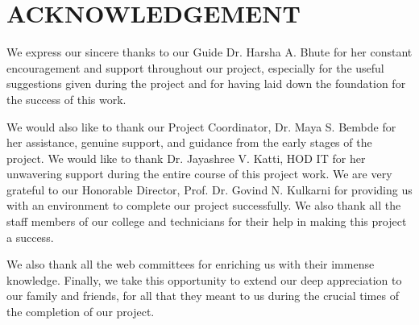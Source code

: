 \chapter*{ACKNOWLEDGEMENT}

\begin{center}
We express our sincere thanks to our Guide Dr. Harsha A. Bhute for her constant
encouragement and support throughout our project, especially for the useful suggestions given
during the project and for having laid down the foundation for the success of this work.

\vspace{2\baselineskip}

We would also like to thank our Project Coordinator, Dr. Maya S. Bembde for her assistance,
genuine support, and guidance from the early stages of the project. We would like to thank Dr.
Jayashree V. Katti, HOD IT for her unwavering support during the entire course of this
project work. We are very grateful to our Honorable Director, Prof. Dr. Govind N. Kulkarni
for providing us with an environment to complete our project successfully. We also thank all
the staff members of our college and technicians for their help in making this project a success.

\vspace{2\baselineskip}

We also thank all the web committees for enriching us with their immense knowledge. Finally,
we take this opportunity to extend our deep appreciation to our family and friends, for all that
they meant to us during the crucial times of the completion of our project.
\end{center}

\clearpage
